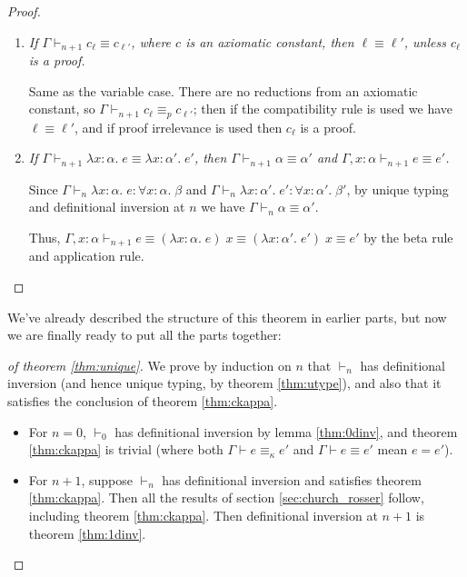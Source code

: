 \begin{proof}
\begin{enumerate}
\item \emph{If $\Gamma\vdash_{n+1} c_{\ell}\equiv c_{\ell'}$, where $c$ is an axiomatic constant, then $\ell\equiv\ell'$, unless $c_\ell$ is a proof.}

Same as the variable case. There are no reductions from an axiomatic constant, so $\Gamma\vdash_{n+1} c_{\ell}\equiv_p c_{\ell'}$; then if the compatibility rule is used we have $\ell\equiv\ell'$, and if proof irrelevance is used then $c_{\ell}$ is a proof.

\item \emph{If $\Gamma\vdash_{n+1} \lambda x:\alpha.\;e\equiv\lambda x:\alpha'.\;e'$, then $\Gamma\vdash_{n+1} \alpha\equiv\alpha'$ and $\Gamma,x:\alpha\vdash_{n+1} e\equiv e'$.}

Since $\Gamma\vdash_n\lambda x:\alpha.\;e:\forall x:\alpha.\;\beta$ and $\Gamma\vdash_n\lambda x:\alpha'.\;e':\forall x:\alpha'.\;\beta'$, by unique typing and definitional inversion at $n$ we have $\Gamma\vdash_n\alpha\equiv\alpha'$.

Thus, $\Gamma,x:\alpha\vdash_{n+1} e\equiv(\lambda x:\alpha.\;e)\;x\equiv(\lambda x:\alpha'.\;e')\;x\equiv e'$ by the beta rule and application rule.
\end{enumerate}
\end{proof}

We've already described the structure of this theorem in earlier parts, but now we are finally ready to put all the parts together:

\begin{proof}[of theorem \ref{thm:unique}]
We prove by induction on $n$ that $\vdash_n$ has definitional inversion (and hence unique typing, by theorem \ref{thm:utype}), and also that it satisfies the conclusion of theorem \ref{thm:ckappa}.
\begin{itemize}
\item For $n=0$, $\vdash_0$ has definitional inversion by lemma \ref{thm:0dinv}, and theorem \ref{thm:ckappa} is trivial (where both $\Gamma\vdash e\equiv_\kappa e'$ and $\Gamma\vdash e\equiv e'$ mean $e=e'$).
\item For $n+1$, suppose $\vdash_n$ has definitional inversion and satisfies theorem \ref{thm:ckappa}. Then all the results of section \ref{sec:church_rosser} follow, including theorem \ref{thm:ckappa}. Then definitional inversion at $n+1$ is theorem \ref{thm:1dinv}.
\end{itemize}
\end{proof}

%